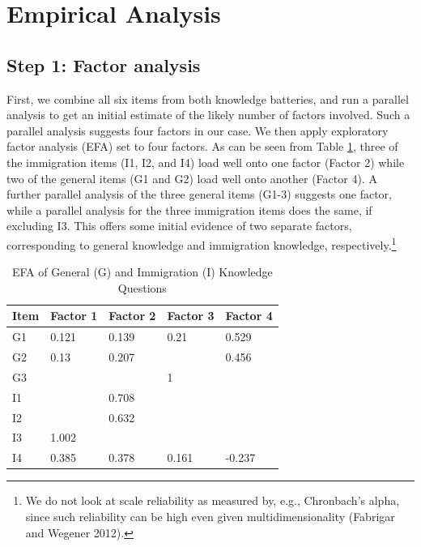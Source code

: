 \documentclass[12pt,halfline,a4paper,]{ouparticle}
\begin{document}
\hypertarget{empirical-analysis}{%
\section{Empirical Analysis}\label{empirical-analysis}}

\hypertarget{step-1-factor-analysis}{%
\subsection{Step 1: Factor analysis}\label{step-1-factor-analysis}}

First, we combine all six items from both knowledge batteries, and run a
parallel analysis to get an initial estimate of the likely number of
factors involved. Such a parallel analysis suggests four factors in our
case. We then apply exploratory factor analysis (EFA) set to four
factors. As can be seen from Table \ref{tab:tab2}, three of the
immigration items (I1, I2, and I4) load well onto one factor (Factor 2)
while two of the general items (G1 and G2) load well onto another
(Factor 4). A further parallel analysis of the three general items
(G1-3) suggests one factor, while a parallel analysis for the three
immigration items does the same, if excluding I3. This offers some
initial evidence of two separate factors, corresponding to general
knowledge and immigration knowledge, respectively.\footnote{We do not
  look at scale reliability as measured by, e.g., Chronbach's alpha,
  since such reliability can be high even given multidimensionality
  (Fabrigar and Wegener 2012).}

\begin{table}

\caption{\label{tab:tab2}EFA of General (G) and Immigration (I) Knowledge Questions}
\centering
\begin{tabular}[t]{lllll}
\toprule
Item & Factor 1 & Factor 2 & Factor 3 & Factor 4\\
\midrule
G1 & 0.121 & 0.139 & 0.21 & 0.529\\
G2 & 0.13 & 0.207 &  & 0.456\\
G3 &  &  & 1 & \\
I1 &  & 0.708 &  & \\
I2 &  & 0.632 &  & \\
\addlinespace
I3 & 1.002 &  &  & \\
I4 & 0.385 & 0.378 & 0.161 & -0.237\\
\bottomrule
\end{tabular}
\end{table}
\end{document}
